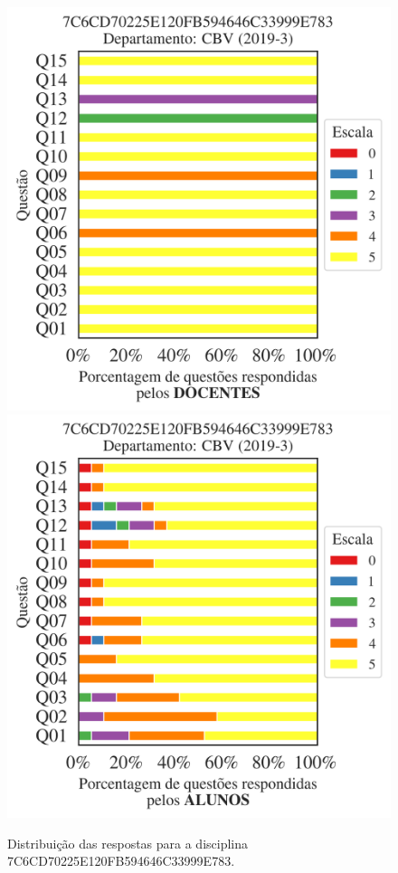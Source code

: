 \documentclass[a4paper,10pt]{article}
\begin{document}
\begin{figure}[h]
\centering
\includegraphics[width=0.485\linewidth]{analise_disciplina_departamento_CBV_7C6CD70225E120FB594646C33999E783_docentes.png}
\includegraphics[width=0.485\linewidth]{analise_disciplina_departamento_CBV_7C6CD70225E120FB594646C33999E783_alunos.png}
\caption{\label{fig:analise_geral_departamento}                Distribuição das respostas para a disciplina 7C6CD70225E120FB594646C33999E783. }
\end{figure}
\end{document}
